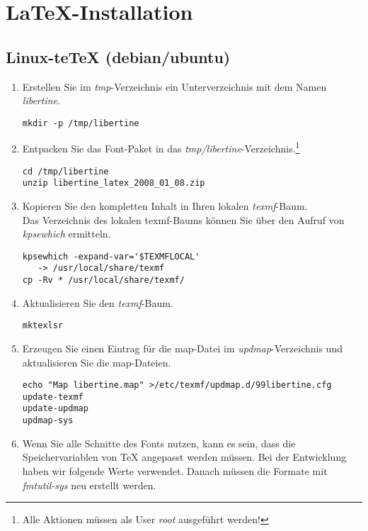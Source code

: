 %
%
%
%
\chapter{\LaTeX-Installation}

\section{Linux-te\TeX{} (debian/ubuntu)}

\begin{enumerate}
\item Erstellen Sie im \textit{tmp}-Verzeichnis ein Unterverzeichnis mit dem Namen \emph{libertine}.
\begin{lstlisting}
mkdir -p /tmp/libertine
\end{lstlisting}
\item Entpacken Sie das Font-Paket in das \textit{tmp/libertine}-Verzeichnis.\footnote{Alle Aktionen müssen als User \textit{root} ausgeführt werden!}
\begin{lstlisting}
cd /tmp/libertine
unzip libertine_latex_2008_01_08.zip
\end{lstlisting}

\item Kopieren Sie den kompletten Inhalt in Ihren lokalen \textit{texmf}-Baum.\\
Das Verzeichnis des lokalen texmf-Baums können Sie über den Aufruf von \textit{kpsewhich} ermitteln.
\begin{lstlisting}
kpsewhich -expand-var='$TEXMFLOCAL'
   -> /usr/local/share/texmf
cp -Rv * /usr/local/share/texmf/
\end{lstlisting}
\item Aktualisieren Sie den \textit{texmf}-Baum.

\begin{lstlisting}
mktexlsr
\end{lstlisting}

\item Erzeugen Sie einen Eintrag für die map-Datei im \textit{updmap}-Verzeichnis und aktualisieren Sie die map-Dateien.

\begin{lstlisting}
echo "Map libertine.map" >/etc/texmf/updmap.d/99libertine.cfg
update-texmf
update-updmap
updmap-sys
\end{lstlisting}

\item Wenn Sie alle Schnitte des Fonts nutzen, kann es sein, dass die Speichervariablen von \TeX{} angepasst werden müssen. Bei der Entwicklung haben wir folgende Werte verwendet. Danach müssen die Formate mit \textit{fmtutil-sys} neu erstellt werden.


\end{enumerate}
